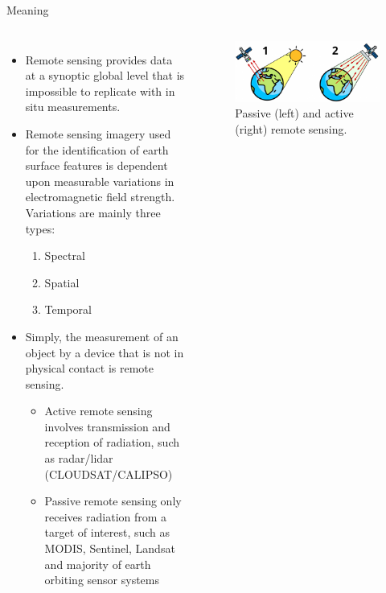 \documentclass[10pt,dvipsnames,ignorenonframetext,aspectratio=169]{beamer}
\providecommand{\tightlist}{%
  \setlength{\itemsep}{0pt}\setlength{\parskip}{0pt}}
\newcommand{\bcolumns}{\begin{columns}[T, onlytextwidth]}
\newcommand{\ecolumns}{\end{columns}}
\begin{document}
\begin{frame}{Meaning}
\protect\hypertarget{meaning}{}
\bcolumns
{}
\footnotesize

\begin{itemize}
\tightlist
\item
  Remote sensing provides data at a synoptic global level that is
  impossible to replicate with in situ measurements.
\item
  Remote sensing imagery used for the identification of earth surface
  features is dependent upon measurable variations in electromagnetic
  field strength. Variations are mainly three types:

  \begin{enumerate}
  \scriptsize
  \item Spectral
  \item Spatial
  \item Temporal
  \end{enumerate}
\item
  Simply, the measurement of an object by a device that is not in
  physical contact is \alert{remote sensing}.

  \begin{itemize}
  \scriptsize
  \item Active remote sensing involves transmission and reception of radiation, such as radar/lidar (CLOUDSAT/CALIPSO)
  \item Passive remote sensing only receives radiation from a target of interest, such as MODIS, Sentinel, Landsat and majority of earth orbiting sensor systems
  \end{itemize}
\end{itemize}


\begin{figure}
\includegraphics[width=0.95\linewidth]{../images/active_passive_remote_sensing} \caption{Passive (left) and active (right) remote sensing.}\label{fig:active-passive-remote}
\end{figure}

\ecolumns
\end{frame}
\end{document}
